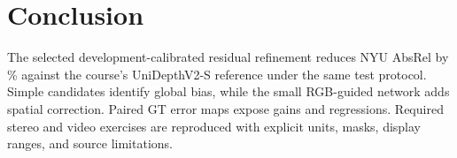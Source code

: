 \documentclass[10pt,twocolumn,letterpaper]{article}
\begin{document}
\section{Conclusion}
The selected development-calibrated residual refinement reduces NYU AbsRel by \MetricGain\% against the course's UniDepthV2-S reference under the same test protocol. Simple candidates identify global bias, while the small RGB-guided network adds spatial correction. Paired GT error maps expose gains and regressions. Required stereo and video exercises are reproduced with explicit units, masks, display ranges, and source limitations.

\clearpage
\twocolumn
{\small


}
\end{document}
